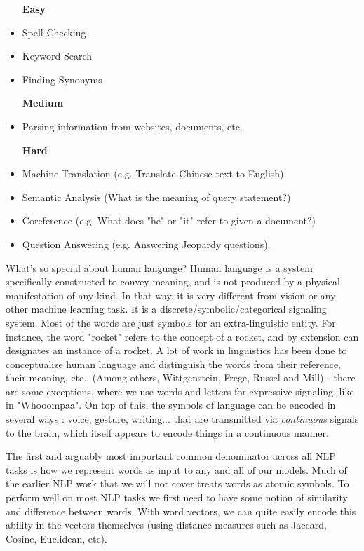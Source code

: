 \documentclass{tufte-handout}
\begin{document}
\begin{itemize}
\item [\textbf{Easy}]
\item Spell Checking
\item Keyword Search
\item Finding Synonyms
\item [\textbf{Medium}]
\item Parsing information from websites, documents, etc.
\item [\textbf{Hard}]
\item Machine Translation (e.g. Translate Chinese text to English)
\item Semantic Analysis (What is the meaning of query statement?)
\item Coreference (e.g. What does "he" or "it" refer to given a document?) 
\item Question Answering (e.g. Answering Jeopardy questions).
\end{itemize}

What's so special about human language? Human language is a system specifically constructed to convey meaning, and is not produced by a physical manifestation of any kind. In that way, it is very different from vision or any other machine learning task. It is a discrete/symbolic/categorical signaling system. Most of the words are just symbols for an extra-linguistic entity. For instance, the word "rocket" refers to the concept of a rocket, and by extension can designates an instance of a rocket. A lot of work in linguistics has been done to conceptualize human language and distinguish the words from their reference, their meaning, etc.. (Among others, Wittgenstein, Frege, Russel and Mill) - there are some exceptions, where we use words and letters for expressive signaling, like in "Whooompaa". On top of this, the symbols of language can be encoded in several ways : voice, gesture, writing... that are transmitted via \emph{continuous} signals to the brain, which itself appears to encode things in a continuous manner. 


The first and arguably most important common denominator across all NLP tasks is how we represent words as input to any and all of our models. Much of the earlier NLP work that we will not cover treats words as atomic symbols. To perform well on most NLP tasks we first need to have some notion of similarity and difference between words. With word vectors, we can quite easily encode this ability in the vectors themselves (using distance measures such as Jaccard, Cosine, Euclidean, etc).
\end{document}
